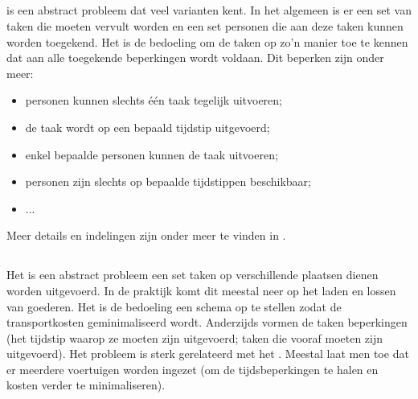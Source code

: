 \subsection{}

 is een abstract probleem dat veel varianten kent. In het algemeen is er een set van taken die moeten vervult worden en een set personen die aan deze taken kunnen worden toegekend. Het is de bedoeling om de taken op zo'n manier toe te kennen dat aan alle toegekende beperkingen wordt voldaan. Dit beperken zijn onder meer:
\begin{itemize}
 \item personen kunnen slechts \'e\'en taak tegelijk uitvoeren;
 \item de taak wordt op een bepaald tijdstip uitgevoerd;
 \item enkel bepaalde personen kunnen de taak uitvoeren;
 \item personen zijn slechts op bepaalde tijdstippen beschikbaar;
 \item ...
\end{itemize}
Meer details en indelingen zijn onder meer te vinden in \cite{Glover:1986:GES:15310.15313,pdcClass}.

\subsection{}

Het  is een abstract probleem een set taken op verschillende plaatsen dienen worden uitgevoerd. In de praktijk komt dit meestal neer op het laden en lossen van goederen. Het is de bedoeling een schema op te stellen zodat de transportkosten geminimaliseerd wordt. Anderzijds vormen de taken beperkingen (het tijdstip waarop ze moeten zijn uitgevoerd; taken die vooraf moeten zijn uitgevoerd). Het probleem is sterk gerelateerd met het . Meestal laat men toe dat er meerdere voertuigen worden ingezet (om de tijdsbeperkingen te halen en kosten verder te minimaliseren).